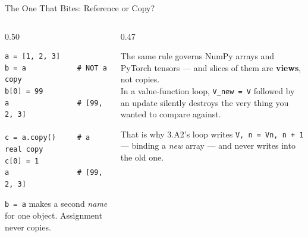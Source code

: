 \begin{frame}[fragile]{The One That Bites: Reference or Copy?}
\begin{columns}[T]
\begin{column}{0.50\textwidth}
\begin{lstlisting}
a = [1, 2, 3]
b = a            # NOT a copy
b[0] = 99
a                # [99, 2, 3]

c = a.copy()     # a real copy
c[0] = 1
a                # [99, 2, 3]
\end{lstlisting}
\vspace{-1mm}
\small
\texttt{b = a} makes a second \emph{name} for one object. Assignment never copies.
\end{column}
\begin{column}{0.47\textwidth}
\begin{cautionbox}[title=\textbf{Why this will bite you}]\footnotesize
The same rule governs NumPy arrays and PyTorch tensors --- and slices of them are \textbf{views}, not copies.\\[1mm]
In a value-function loop, \texttt{V\_new = V} followed by an update silently destroys the very thing you wanted to compare against.
\end{cautionbox}
\medskip
\begin{examplebox}\footnotesize
That is why 3.A2's loop writes \texttt{V, n = Vn, n + 1} --- binding a \emph{new} array --- and never writes into the old one.
\end{examplebox}
\end{column}
\end{columns}
\vspace{1mm}
\end{frame}

